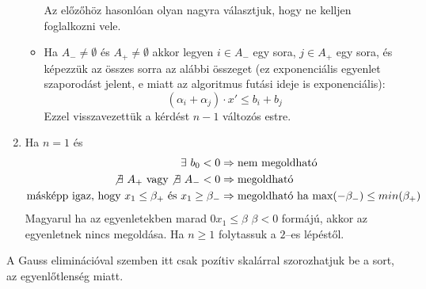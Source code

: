 \begin{enumerate}
\begin{itemize}
		            Az előzőhöz hasonlóan olyan nagyra választjuk, hogy ne kelljen foglalkozni
		            vele.
		      \item Ha $A_- \neq \emptyset$ és $A_+ \neq \emptyset$ akkor legyen
		            $i \in A_-$ egy sora, $j \in A_+$ egy sora, és képezzük az összes sorra az
		            alábbi összeget (ez exponenciális egyenlet szaporodást jelent, e miatt az
		            algoritmus futási ideje is exponenciális):
		            \[
			            \left( \alpha_i + \alpha_j \right) \cdot x' \leq b_i + b_j
		            \]
		            Ezzel visszavezettük a kérdést $n-1$ változós estre.
	      \end{itemize}
	\item Ha $n=1$ és
	      \begin{align*}
		      \exists~b_0 < 0                                    & \Rightarrow \mbox{nem megoldható}                                        \\
		      \not \exists~A_+ \mbox{ vagy} \not \exists~A_- < 0 & \Rightarrow \mbox{megoldható}                                            \\
		      \mbox{másképp igaz, hogy } x_1 \leq \beta_+ \mbox{ és } x_1 \geq \beta_-
		                                                         & \Rightarrow \mbox{megoldható ha } \mbox{max}(-\beta_-) \leq min(\beta_+)
	      \end{align*}
	      Magyarul ha az egyenletekben marad $0 x_1 \leq \beta$ $\beta < 0$ formájú,
	      akkor az egyenletnek nincs megoldása.
	      Ha $n \geq 1$ folytassuk a $2$--es lépéstől.
\end{enumerate}

A Gauss eliminációval szemben itt csak pozítiv skalárral szorozhatjuk be a sort,
az egyenlőtlenség miatt.
